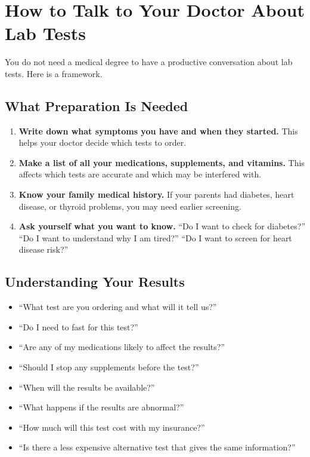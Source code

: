 \clearpage
\section{How to Talk to Your Doctor About Lab Tests}

You do not need a medical degree to have a productive conversation about lab tests. Here is a framework.

\subsection{What Preparation Is Needed}

\begin{enumerate}
    \item \textbf{Write down what symptoms you have and when they started.} This helps your doctor decide which tests to order.
    \item \textbf{Make a list of all your medications, supplements, and vitamins.} This affects which tests are accurate and which may be interfered with.
    \item \textbf{Know your family medical history.} If your parents had diabetes, heart disease, or thyroid problems, you may need earlier screening.
    \item \textbf{Ask yourself what you want to know.} ``Do I want to check for diabetes?'' ``Do I want to understand why I am tired?'' ``Do I want to screen for heart disease risk?''
\end{enumerate}

\subsection{Understanding Your Results}

\begin{itemize}
    \item ``What test are you ordering and what will it tell us?''
    \item ``Do I need to fast for this test?''
    \item ``Are any of my medications likely to affect the results?''
    \item ``Should I stop any supplements before the test?''
    \item ``When will the results be available?''
    \item ``What happens if the results are abnormal?''
    \item ``How much will this test cost with my insurance?''
    \item ``Is there a less expensive alternative test that gives the same information?''
\end{itemize}

